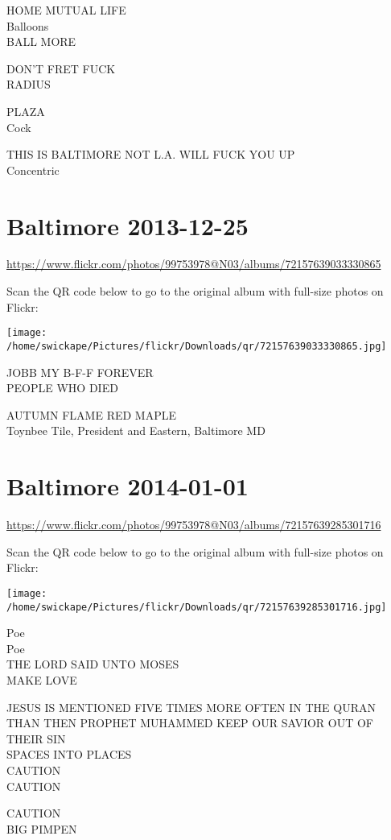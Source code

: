 \documentclass[10pt,letterpaper]{article}
\begin{document}
HOME MUTUAL LIFE\\
Balloons\\
BALL MORE

DON'T FRET FUCK\\
RADIUS

PLAZA\\
Cock

THIS IS BALTIMORE NOT L.A. WILL FUCK YOU UP\\
Concentric


\section*{Baltimore 2013-12-25}

\url{https://www.flickr.com/photos/99753978@N03/albums/72157639033330865}

Scan the QR code below to go to the original album with full-size photos on Flickr:

\texttt{[image: /home/swickape/Pictures/flickr/Downloads/qr/72157639033330865.jpg]}


JOBB MY B{-}F{-}F FOREVER\\
PEOPLE WHO DIED

AUTUMN FLAME RED MAPLE\\
Toynbee Tile, President and Eastern, Baltimore MD


\section*{Baltimore 2014-01-01}

\url{https://www.flickr.com/photos/99753978@N03/albums/72157639285301716}

Scan the QR code below to go to the original album with full-size photos on Flickr:

\texttt{[image: /home/swickape/Pictures/flickr/Downloads/qr/72157639285301716.jpg]}


Poe\\
Poe\\
THE LORD SAID UNTO MOSES\\
MAKE LOVE

JESUS IS MENTIONED FIVE TIMES MORE OFTEN IN THE QURAN THAN THEN PROPHET MUHAMMED KEEP OUR SAVIOR OUT OF THEIR SIN\\
SPACES INTO PLACES\\
CAUTION\\
CAUTION

CAUTION\\
BIG PIMPEN
\end{document}

